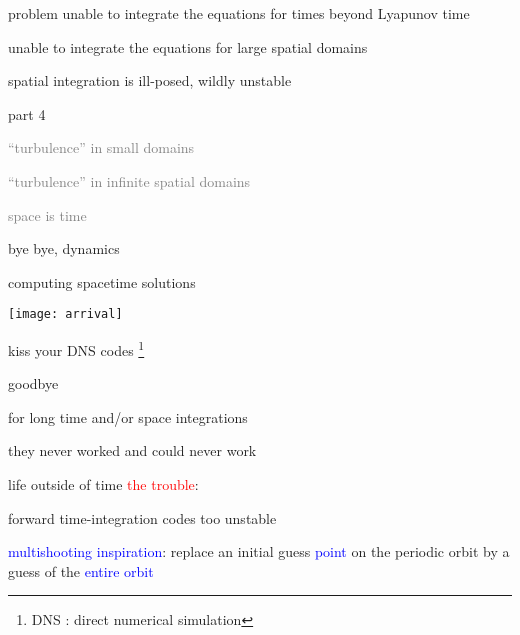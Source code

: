 \begin{frame}{problem}
unable to integrate the equations for times beyond Lyapunov time


\vfill

unable to integrate the equations for large spatial domains

\bigskip

{\Large
spatial integration is ill-posed, wildly  unstable
                  }
\end{frame}


\begin{frame}{part 4}
\begin{enumerate}
              \item
    \textcolor{gray}{\small
``turbulence'' in small domains
              \item
``turbulence'' in infinite spatial domains
              \item
space is time
    }
              \item
    {\Large
bye bye, dynamics
    }
            \end{enumerate}
\end{frame}

\begin{frame}{computing spacetime solutions}
\begin{center}
\texttt{[image: arrival]}
\end{center}
\end{frame}

\begin{frame}{kiss your DNS codes
\footnote{DNS : direct numerical simulation}
}
\begin{center}
{\huge goodbye}
\end{center}

\vfill

for long time and/or space integrations

\medskip

\hfill they never worked and could never work
\end{frame}

\begin{frame}{life outside of time}
\textcolor{red}{the trouble}:

forward time-integration codes too unstable

\bigskip
\bigskip

\textcolor{blue}{multishooting inspiration}:
 replace an initial guess \textcolor{blue}{point} on the periodic
orbit by a guess of the \textcolor{blue}{entire orbit}
\end{frame}

